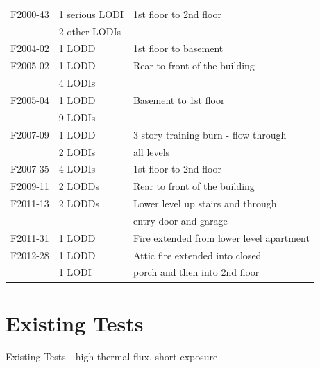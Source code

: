 \documentclass[12pt,oneside]{book}
\begin{document}
\begin{table}[!ht]
\begin{tabular}{lll}
F2000-43 \cite{NIOSH:McFall3}       &  1 serious LODI     &  1st floor to 2nd floor                    \\
                                    &  2 other LODIs      &                                            \\
F2004-02 \cite{NIOSH:Berardinelli}  &  1 LODD             &  1st floor to basement                     \\
F2005-02 \cite{NIOSH:Koedam}        &  1 LODD             &  Rear to front of the building             \\
                                    &  4 LODIs            &                                            \\
F2005-04 \cite{NIOSH:McFall4}       &  1 LODD             &  Basement to 1st floor                     \\
                                    &  9 LODIs            &                                            \\
F2007-09 \cite{NIOSH:Tarley}        &  1 LODD             &  3 story training burn - flow through      \\
                                    &  2 LODIs            &  all levels                                \\
F2007-35 \cite{NIOSH:Braddee}       &  4 LODIs            &  1st floor to 2nd floor                    \\
F2009-11 \cite{NIOSH:Merinar}       &  2 LODDs            &  Rear to front of the building             \\
F2011-13 \cite{NIOSH:Bowyer2}       &  2 LODDs            &  Lower level up stairs and through         \\
                                    &                     &  entry door and garage                     \\
F2011-31 \cite{NIOSH:Loflin}        &  1 LODD             &  Fire extended from lower level apartment  \\
F2012-28 \cite{NIOSH:Bowyer}        &  1 LODD             &  Attic fire extended into closed           \\
                                    &  1 LODI             &  porch and then into 2nd floor             \\
\bottomrule
\end{tabular}
\label{tab:LODD}
\end{table}

\chapter{Existing Tests}
Existing Tests - high thermal flux, short exposure
\end{document}
